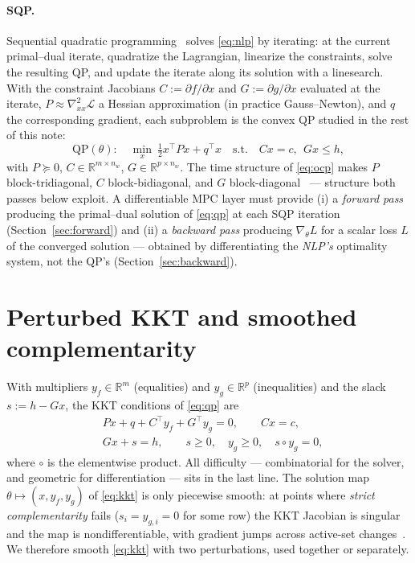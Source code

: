 \documentclass[10pt,twocolumn]{article}
\newcommand{\R}{\mathbb{R}}
\newcommand{\half}{\tfrac{1}{2}}
\begin{document}
\paragraph{SQP.} Sequential quadratic programming~\cite[Ch.~18]{nw} solves
\eqref{eq:nlp} by iterating: at the current primal--dual iterate, quadratize the
Lagrangian, linearize the constraints, solve the resulting QP, and update the
iterate along its solution with a linesearch. With the constraint Jacobians
$C := \partial f/\partial x$ and $G := \partial g/\partial x$ evaluated at the
iterate, $P \approx \nabla^2_{xx}\mathcal L$ a Hessian approximation (in practice
Gauss--Newton), and $q$ the corresponding gradient, each subproblem is the convex QP
studied in the rest of this note:
\begin{equation}
\label{eq:qp}
\mathrm{QP}(\theta):\quad
\min_{x}\ \half x^\top P x + q^\top x
\quad\text{s.t.}\quad Cx = c,\ \ Gx \le h,
\end{equation}
with $P\succeq 0$, $C\in\R^{m\times n_w}$, $G\in\R^{p\times n_w}$. The time
structure of \eqref{eq:ocp} makes $P$ block-tridiagonal, $C$ block-bidiagonal, and
$G$ block-diagonal~\cite{turbompc} --- structure both passes below exploit. A
differentiable MPC layer must provide (i) a \emph{forward pass} producing the
primal--dual solution of \eqref{eq:qp} at each SQP iteration
(Section~\ref{sec:forward}) and (ii) a \emph{backward pass} producing
$\nabla_\theta L$ for a scalar loss $L$ of the converged solution --- obtained by
differentiating the \emph{NLP's} optimality system, not the QP's
(Section~\ref{sec:backward}).

\section{Perturbed KKT and smoothed complementarity}
\label{sec:pkkt}

With multipliers $y_f\in\R^m$ (equalities) and $y_g\in\R^p$ (inequalities) and the
slack $s := h - Gx$, the KKT conditions of \eqref{eq:qp} are
\begin{equation}
\label{eq:kkt}
\begin{aligned}
&Px+q+C^\top y_f+G^\top y_g = 0, \qquad Cx = c,\\
&Gx + s = h,\qquad s\ge 0,\quad y_g\ge 0,\quad s\circ y_g = 0,
\end{aligned}
\end{equation}
where $\circ$ is the elementwise product. All difficulty --- combinatorial for the
solver, and geometric for differentiation --- sits in the last line. The solution map
$\theta \mapsto (x,y_f,y_g)$ of \eqref{eq:kkt} is only piecewise smooth: at points
where \emph{strict complementarity} fails ($s_i = y_{g,i} = 0$ for some row) the KKT
Jacobian is singular and the map is nondifferentiable, with gradient jumps across
active-set changes~\cite{optnet,frey}. We therefore smooth \eqref{eq:kkt} with two
perturbations, used together or separately.
\end{document}
